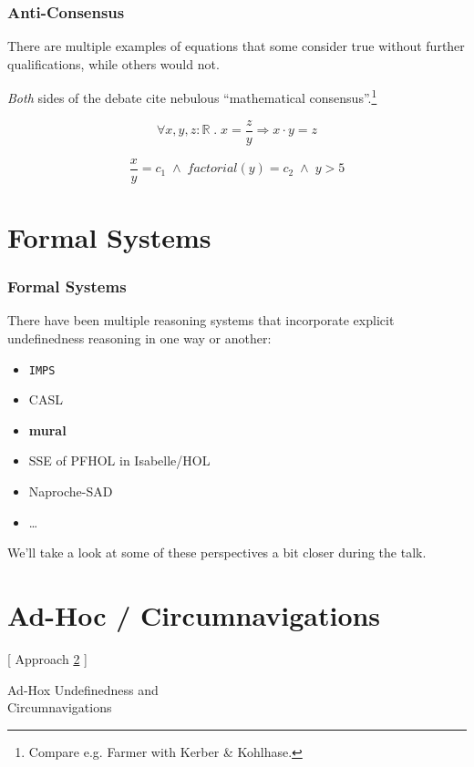 \documentclass[aspectratio=169, usenames, dvipsnames]{beamer}
\newcommand{\IMPS}{\texttt{IMPS}\xspace}
\begin{document}
\begin{frame}
\frametitle{Anti-Consensus}
There are multiple examples of equations that some consider true without further qualifications, while others would not.

\emph{Both} sides of the debate cite nebulous ``mathematical consensus''.\footnote{Compare e.g. Farmer with Kerber \& Kohlhase.}
\pause\bigskip

$$\forall x, y, z : \mathbb{R} \; . \; x = \frac{z}{y} \Rightarrow x \cdot y = z$$
\pause\medskip

$$\frac{x}{y} = c_1 \;\wedge\; factorial(y) = c_2 \;\wedge\; y > 5$$
\end{frame}

\section{Formal Systems}

\begin{frame}
\frametitle{Formal Systems}

There have been multiple reasoning systems that incorporate explicit undefinedness reasoning in one way or another:
\bigskip

\begin{itemize}
\item \IMPS
\item CASL
\item \textbf{mural}
\item SSE of PFHOL in Isabelle/HOL
\item Naproche-SAD
\item \dots
\end{itemize}
\bigskip

We'll take a look at some of these perspectives a bit closer during the talk.
\end{frame}

\setcounter{section}{-1}
\section{Ad-Hoc / Circumnavigations}\label{adhoc}

\begin{frame}
\begin{center}
\Large [ Approach \ref{adhoc} ]\bigskip

Ad-Hox Undefinedness and\\ Circumnavigations
\normalsize
\end{center}
\end{frame}
\end{document}
